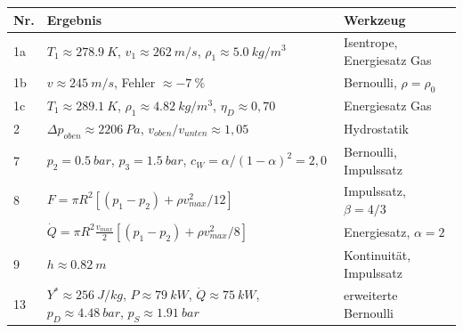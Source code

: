 \documentclass[11pt,a4paper]{article}
\begin{document}
\begin{center}
\renewcommand{\arraystretch}{1.5}
\begin{tabularx}{\linewidth}{@{}l>{\raggedright\arraybackslash}X>{\raggedright\arraybackslash}p{3.4cm}@{}}
\toprule
\textbf{Nr.} & \textbf{Ergebnis} & \textbf{Werkzeug} \\ \midrule
1a & $T_1 \approx \SI{278.9}{K}$, $v_1 \approx \SI{262}{m/s}$, $\rho_1 \approx \SI{5.0}{kg/m^3}$ & Isentrope, Energiesatz Gas \\
1b & $v \approx \SI{245}{m/s}$, Fehler $\approx \SI{-7}{\percent}$ & Bernoulli, $\rho = \rho_0$ \\
1c & $T_1 \approx \SI{289.1}{K}$, $\rho_1 \approx \SI{4.82}{kg/m^3}$, $\eta_D \approx 0{,}70$ & Energiesatz Gas \\
2 & $\Delta p_{oben} \approx \SI{2206}{Pa}$, $v_{oben}/v_{unten} \approx 1{,}05$ & Hydrostatik \\
7 & $p_2 = \SI{0.5}{bar}$, $p_3 = \SI{1.5}{bar}$, $c_W = \alpha/(1-\alpha)^2 = 2{,}0$ & Bernoulli, Impulssatz \\
8 & $F = \pi R^2\left[(p_1 - p_2) + \rho v_{max}^2/12\right]$ & Impulssatz, $\beta = 4/3$ \\
  & $\dot Q = \pi R^2 \frac{v_{max}}{2}\left[(p_1 - p_2) + \rho v_{max}^2/8\right]$ & Energiesatz, $\alpha = 2$ \\
9 & $h \approx \SI{0.82}{m}$ & Kontinuität, Impulssatz \\
13 & $Y^* \approx \SI{256}{J/kg}$, $P \approx \SI{79}{kW}$, $\dot Q \approx \SI{75}{kW}$, $p_D \approx \SI{4.48}{bar}$, $p_S \approx \SI{1.91}{bar}$ & erweiterte Bernoulli \\
\bottomrule
\end{tabularx}
\end{center}
\end{document}
